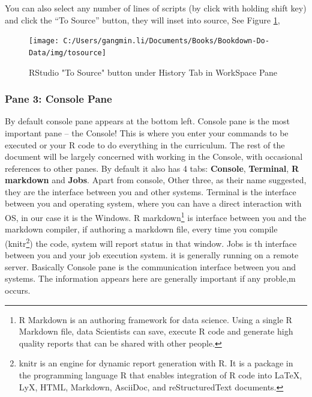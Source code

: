 \documentclass[
]{book}
\begin{document}
You can also select any number of lines of scripts (by click with holding shift key) and click the ``To Source'' button, they will inset into source, See Figure \ref{fig:tosource},

\begin{figure}

{\centering \texttt{[image: C:/Users/gangmin.li/Documents/Books/Bookdown-Do-Data/img/tosource]} 

}

\caption{RStudio "To Source" button under History Tab in WorkSpace Pane}\label{fig:tosource}
\end{figure}

\hypertarget{pane-3-console-pane}{%
\subsubsection*{Pane 3: Console Pane}\label{pane-3-console-pane}}


By default console pane appears at the bottom left. Console pane is the most important pane -- the Console! This is where you enter your commands to be executed or your R code to do everything in the curriculum. The rest of the document will be largely concerned with working in the Console, with occasional references to other panes.
By default it also has 4 tabs: \textbf{Console}, \textbf{Terminal}, \textbf{R markdown} and \textbf{Jobs}. Apart from console, Other three, as their name suggested, they are the interface between you and other systems. Terminal is the interface between you and operating system, where you can have a direct interaction with OS, in our case it is the Windows. R markdown\footnote{R Markdown is an authoring framework for data science. Using a single R Markdown file, data Scientists can save, execute R code and generate high quality reports that can be shared with other people.} is interface between you and the markdown compiler, if authoring a markdown file, every time you compile (knitr\footnote{knitr is an engine for dynamic report generation with R. It is a package in the programming language R that enables integration of R code into LaTeX, LyX, HTML, Markdown, AsciiDoc, and reStructuredText documents.}) the code, system will report status in that window. Jobs is th interface between you and your job execution system. it is generally running on a remote server.
Basically Console pane is the communication interface between you and systems. The information appears here are generally important if any proble,m occurs.
\end{document}
